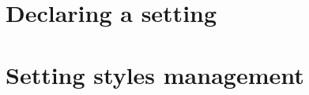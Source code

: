 \documentclass[a4paper,10pt,twoside]{book}
\begin{document}
\section{Declaring a setting}
\label{sec:DeclaringASetting}
\section{Setting styles management}
\label{sec:SettingStylesManagement}

%
%
%
%
%
%
%
%
%
%
%
%
%
%
\end{document}
